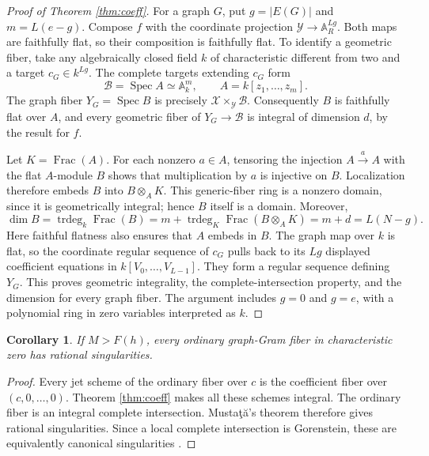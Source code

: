 \documentclass[11pt]{article}
\numberwithin{equation}{section}
\newtheorem{corollary}[theorem]{Corollary}
\theoremstyle{remark}
\newcommand{\A}{\mathbb A}
\newcommand{\Spec}{\operatorname{Spec}}
\begin{document}
\begin{proof}[Proof of Theorem \ref{thm:coeff}]
For a graph $G$, put $g=|E(G)|$ and $m=L(e-g)$. Compose $f$
with the coordinate projection $\mathcal Y\to\A_R^{Lg}$.
Both maps are faithfully flat, so their composition is faithfully
flat. To identify a geometric fiber, take any algebraically closed
field $k$ of characteristic different from two and a target
$c_G\in k^{Lg}$. The complete targets extending $c_G$ form
\[
 \mathcal B=\Spec A\simeq\A_k^m,\qquad A=k[z_1,\ldots,z_m].
\]
The graph fiber $Y_G=\Spec B$ is precisely
$\mathcal X\times_{\mathcal Y}\mathcal B$. Consequently $B$ is faithfully
flat over $A$, and every geometric fiber of $Y_G\to \mathcal B$ is integral
of dimension $d$, by the result for $f$.

Let $K=\operatorname{Frac}(A)$. For each nonzero $a\in A$, tensoring
the injection $A\xrightarrow{\,a\,}A$ with the flat $A$-module $B$
shows that multiplication by $a$ is injective on $B$. Localization
therefore embeds $B$ into $B\otimes_A K$. This generic-fiber ring
is a nonzero domain, since it is geometrically integral; hence
$B$ itself is a domain. Moreover,
\[
 \dim B=\operatorname{trdeg}_k\operatorname{Frac}(B)
       =m+\operatorname{trdeg}_K\operatorname{Frac}(B\otimes_AK)
       =m+d=L(N-g).
\]
Here faithful flatness also ensures that $A$ embeds in $B$.
The graph map over $k$ is flat, so the coordinate regular sequence
of $c_G$ pulls back to its $Lg$ displayed coefficient equations
in $k[V_0,\ldots,V_{L-1}]$. They form a regular sequence defining
$Y_G$. This proves geometric integrality,
the complete-intersection property, and the dimension for every
graph fiber. The argument includes $g=0$ and $g=e$, with a
polynomial ring in zero variables interpreted as $k$.
\end{proof}

\begin{corollary}\label{cor:positive}
If $M>F(h)$, every ordinary graph-Gram fiber in characteristic
zero has rational singularities.
\end{corollary}
\begin{proof}
Every jet scheme of the ordinary fiber over $c$ is the coefficient
fiber over $(c,0,\ldots,0)$. Theorem \ref{thm:coeff} makes all
these schemes integral. The ordinary fiber is an integral
complete intersection. Musta\c{t}\u{a}'s theorem
\cite[Theorem 0.1]{Mjets} therefore gives rational singularities.
Since a local complete intersection is Gorenstein, these are equivalently
canonical singularities \cite[discussion following Theorem 0.1]{Mjets}.
\end{proof}
\end{document}
